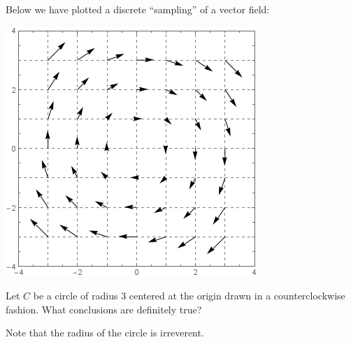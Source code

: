 \documentclass{ximera}
\begin{document}
\begin{exercise}
  Below we have plotted a discrete ``sampling'' of a vector field:
  \begin{image}
    \includegraphics{field3.png}
  \end{image}
  Let $C$ be a circle of radius $3$ centered at the origin drawn in a
  counterclockwise fashion.  What conclusions are definitely true?
  \begin{selectAll}
  \end{selectAll}
  \begin{hint}
    Note that the radius of the circle is irreverent. 
  \end{hint}
\end{exercise}
\end{document}
